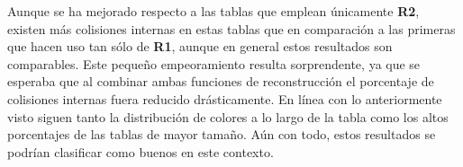 \documentclass[12pt,spanish,listoffigures,listoftables,listofalgorithms]{tfgetsinf}
\begin{document}
\def\arraystretch{1.5}
\begin{table}[H]
	\centering
	\caption{Porcentajes de colisiones para las tablas empleando la alternancia de las funciones de reconstrucción}
	\label{colR1R2}
\end{table}

Aunque se ha mejorado respecto a las tablas que emplean únicamente \textbf{R2}, existen más colisiones internas en estas tablas que en comparación a las primeras que hacen uso tan sólo de \textbf{R1}, aunque en general estos resultados son comparables. Este pequeño empeoramiento resulta sorprendente, ya que se esperaba que al combinar ambas funciones de reconstrucción el porcentaje de colisiones internas fuera reducido drásticamente. En línea con lo anteriormente visto siguen tanto la distribución de colores a lo largo de la tabla como los altos porcentajes de las tablas de mayor tamaño. Aún con todo, estos resultados se podrían clasificar como buenos en este contexto.
\end{document}
